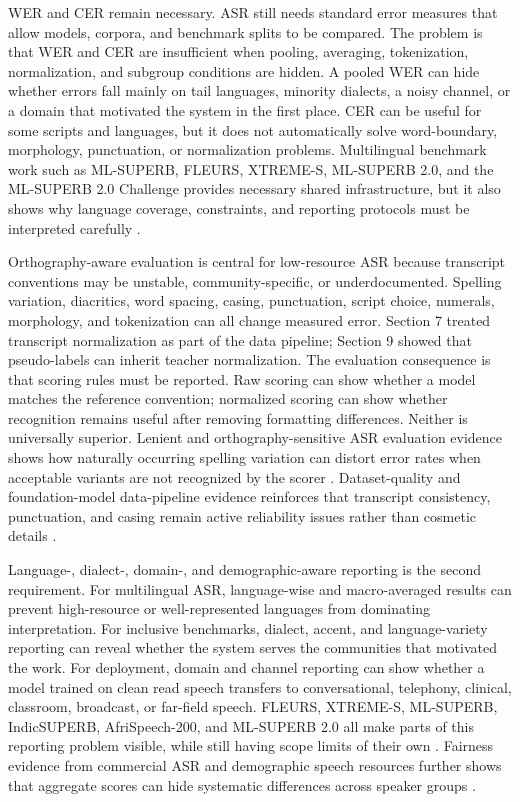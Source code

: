 \documentclass[pdflatex,sn-basic,iicol]{sn-jnl}
\theoremstyle{thmstyleone}
\theoremstyle{thmstyletwo}
\theoremstyle{thmstylethree}
\begin{document}
WER and CER remain necessary. ASR still needs standard error measures that allow models, corpora, and benchmark splits to be compared. The problem is that WER and CER are insufficient when pooling, averaging, tokenization, normalization, and subgroup conditions are hidden. A pooled WER can hide whether errors fall mainly on tail languages, minority dialects, a noisy channel, or a domain that motivated the system in the first place. CER can be useful for some scripts and languages, but it does not automatically solve word-boundary, morphology, punctuation, or normalization problems. Multilingual benchmark work such as ML-SUPERB, FLEURS, XTREME-S, ML-SUPERB 2.0, and the ML-SUPERB 2.0 Challenge provides necessary shared infrastructure, but it also shows why language coverage, constraints, and reporting protocols must be interpreted carefully \citep{shi2023mlsuperb,conneau2022fleurs,conneau2022xtreme_s,shi2024mlsuperb2,chen2025mlsuperb2challenge}.

Orthography-aware evaluation is central for low-resource ASR because transcript conventions may be unstable, community-specific, or underdocumented. Spelling variation, diacritics, word spacing, casing, punctuation, script choice, numerals, morphology, and tokenization can all change measured error. Section 7 treated transcript normalization as part of the data pipeline; Section 9 showed that pseudo-labels can inherit teacher normalization. The evaluation consequence is that scoring rules must be reported. Raw scoring can show whether a model matches the reference convention; normalized scoring can show whether recognition remains useful after removing formatting differences. Neither is universally superior. Lenient and orthography-sensitive ASR evaluation evidence shows how naturally occurring spelling variation can distort error rates when acceptable variants are not recognized by the scorer \citep{karita2023lenient}. Dataset-quality and foundation-model data-pipeline evidence reinforces that transcript consistency, punctuation, and casing remain active reliability issues rather than cosmetic details \citep{lau2025_data_quality_multilingual_speech,tian24_interspeech}.

Language-, dialect-, domain-, and demographic-aware reporting is the second requirement. For multilingual ASR, language-wise and macro-averaged results can prevent high-resource or well-represented languages from dominating interpretation. For inclusive benchmarks, dialect, accent, and language-variety reporting can reveal whether the system serves the communities that motivated the work. For deployment, domain and channel reporting can show whether a model trained on clean read speech transfers to conversational, telephony, clinical, classroom, broadcast, or far-field speech. FLEURS, XTREME-S, ML-SUPERB, IndicSUPERB, AfriSpeech-200, and ML-SUPERB 2.0 all make parts of this reporting problem visible, while still having scope limits of their own \citep{conneau2022fleurs,conneau2022xtreme_s,shi2023mlsuperb,javed2023indsuperb,olatunji2023_afrispeech200,shi2024mlsuperb2}. Fairness evidence from commercial ASR and demographic speech resources further shows that aggregate scores can hide systematic differences across speaker groups \citep{koenecke2020racialdisparities,liu2021casualconversations}.
\end{document}
